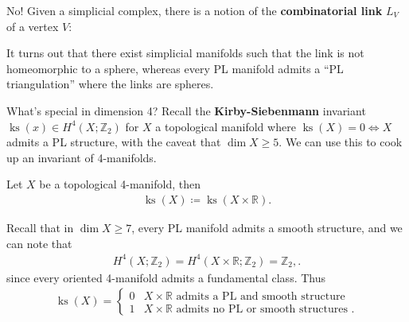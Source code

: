 \begin{answer}

No! Given a simplicial complex, there is a notion of the
\textbf{combinatorial link} \(L_V\) of a vertex \(V\):

\begin{figure}
\centering
{}
\end{figure}

It turns out that there exist simplicial manifolds such that the link is
not homeomorphic to a sphere, whereas every PL manifold admits a ``PL
triangulation'' where the links are spheres.

\end{answer}

\begin{remark}

What's special in dimension 4? Recall the \textbf{Kirby-Siebenmann}
invariant \(\operatorname{ks}(x) \in H^4(X; {\mathbb{Z}}_2)\) for \(X\)
a topological manifold where \(\operatorname{ks}(X) = 0 \iff X\) admits
a PL structure, with the caveat that \(\dim X \geq 5\). We can use this
to cook up an invariant of 4-manifolds.

\end{remark}

\begin{definition}

Let \(X\) be a topological 4-manifold, then
\begin{align*}
\operatorname{ks}(X) \coloneqq\operatorname{ks}(X \times{\mathbb{R}})
.\end{align*}

\end{definition}

\begin{remark}

Recall that in \(\dim X\geq 7\), every PL manifold admits a smooth
structure, and we can note that
\begin{align*}
H^4(X; {\mathbb{Z}}_2) = H^4(X \times{\mathbb{R}}; {\mathbb{Z}}_2) = {\mathbb{Z}}_2,
.\end{align*}
since every oriented 4-manifold admits a fundamental class. Thus
\begin{align*}
\operatorname{ks}(X) = 
\begin{cases}
0 & X \times{\mathbb{R}}\text{ admits a PL and smooth structure} 
\\
1 & X \times{\mathbb{R}}\text{ admits no PL or smooth structures }.
\end{cases}
\end{align*}

\end{remark}

